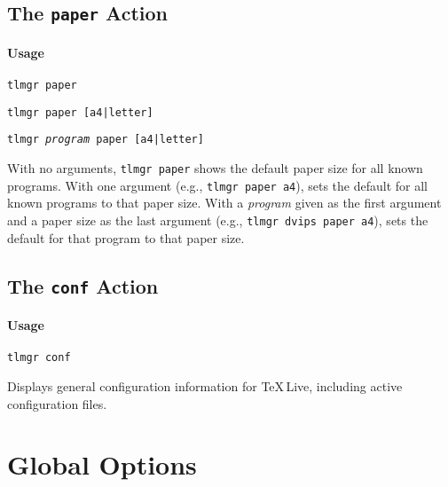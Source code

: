 \documentclass[11pt]{article}
\begin{document}
\clearpage

\subsection{The \texttt{paper} Action}
\label{paper}

\paragraph{Usage}
\begin{list}{}{}
\item \texttt{tlmgr paper} 
\item \texttt{tlmgr paper [a4|letter]} 
\item \texttt{tlmgr \textit{program} paper [a4|letter]} 
\end{list}

With no arguments, \texttt{tlmgr paper} shows the default paper size for all known programs.
With one argument (e.g., \texttt{tlmgr paper a4}), sets the default for all known programs to that
paper size.
With a \textit{program} given as the first argument and a paper size as the last argument 
(e.g., \texttt{tlmgr dvips paper a4}), sets the default for that program to that paper size.

\clearpage

\subsection{The \texttt{conf} Action}
\label{conf}
\paragraph{Usage}
\begin{list}{}{}
\item \texttt{tlmgr conf}
\end{list}

Displays general configuration information for \TeX\,Live, including active configuration files.

\clearpage

\clearpage
\section{Global Options}
\label{GlobalOptions}
\end{document}
